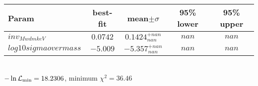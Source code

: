 \begin{tabular}{|l|c|c|c|c|} 
 \hline 
Param & best-fit & mean$\pm\sigma$ & 95\% lower & 95\% upper \\ \hline 
$inv_{M wdm keV }$ &$0.0742$ & $0.1424_{nan}^{+nan}$ & $nan$ & $nan$ \\ 
$log10sigmaovermass$ &$-5.009$ & $-5.357_{nan}^{+nan}$ & $nan$ & $nan$ \\ 
\hline 
 \end{tabular} \\ 
$-\ln{\cal L}_\mathrm{min} =18.2306$, minimum $\chi^2=36.46$ \\ 
